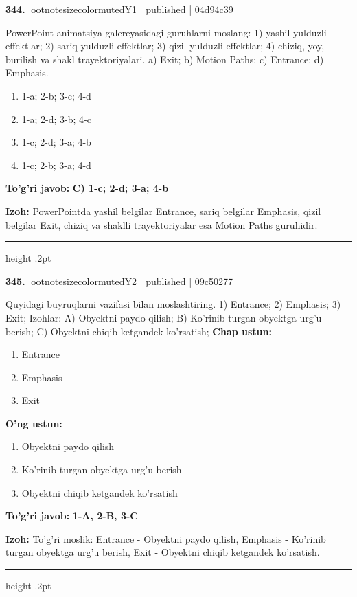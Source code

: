\documentclass[10pt,a4paper]{article}
\begin{document}
\textbf{\color{ink}344.} {ootnotesizecolor{muted}Y1 | published | 04d94c39}
\par
PowerPoint animatsiya galereyasidagi guruhlarni moslang: 1) yashil yulduzli effektlar; 2) sariq yulduzli effektlar; 3) qizil yulduzli effektlar; 4) chiziq, yoy, burilish va shakl trayektoriyalari. a) Exit; b) Motion Paths; c) Entrance; d) Emphasis.
\begin{enumerate}[label=\Alph*),leftmargin=9mm]
\item 1-a; 2-b; 3-c; 4-d
\item 1-a; 2-d; 3-b; 4-c
\item 1-c; 2-d; 3-a; 4-b
\item 1-c; 2-b; 3-a; 4-d
\end{enumerate}
\begin{tcolorbox}[enhanced,breakable,colback=teal!4,colframe=teal!55!black,boxrule=0.45pt,arc=1.2mm,left=2.8mm,right=2.8mm,top=2mm,bottom=2mm]
\textbf{\color{teal}To'g'ri javob:} \textbf{C) 1-c; 2-d; 3-a; 4-b}
\par\smallskip
\textbf{Izoh:} PowerPointda yashil belgilar Entrance, sariq belgilar Emphasis, qizil belgilar Exit, chiziq va shaklli trayektoriyalar esa Motion Paths guruhidir.
\end{tcolorbox}
\vspace{2mm}\hrule height .2pt\vspace{2mm}

\textbf{\color{ink}345.} {ootnotesizecolor{muted}Y2 | published | 09c50277}
\par
Quyidagi buyruqlarni vazifasi bilan moslashtiring.  1) Entrance;  2) Emphasis;  3) Exit;  Izohlar: A) Obyektni paydo qilish;  B) Ko'rinib turgan obyektga urg'u berish;  C) Obyektni chiqib ketgandek ko'rsatish;
\textbf{Chap ustun:}\begin{enumerate}[label=\arabic*),leftmargin=9mm]
\item Entrance
\item Emphasis
\item Exit
\end{enumerate}
\textbf{O'ng ustun:}\begin{enumerate}[label=\Alph*),leftmargin=9mm]
\item Obyektni paydo qilish
\item Ko'rinib turgan obyektga urg'u berish
\item Obyektni chiqib ketgandek ko'rsatish
\end{enumerate}
\begin{tcolorbox}[enhanced,breakable,colback=teal!4,colframe=teal!55!black,boxrule=0.45pt,arc=1.2mm,left=2.8mm,right=2.8mm,top=2mm,bottom=2mm]
\textbf{\color{teal}To'g'ri javob:} \textbf{1-A, 2-B, 3-C}
\par\smallskip
\textbf{Izoh:} To'g'ri moslik: Entrance - Obyektni paydo qilish, Emphasis - Ko'rinib turgan obyektga urg'u berish, Exit - Obyektni chiqib ketgandek ko'rsatish.
\end{tcolorbox}
\vspace{2mm}\hrule height .2pt\vspace{2mm}
\end{document}
